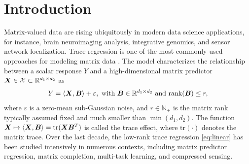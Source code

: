 \documentclass[aos]{imsart}
\theoremstyle{definition}
\begin{document}

\section{Introduction}
\label{sec:intro}

Matrix-valued data are rising ubiquitously in modern data science applications, for instance, brain neuroimaging analysis, integrative genomics, and sensor network localization. Trace regression is one of the most commonly used approaches for modeling matrix data \cite{fan2019generalized,hamidi2019low}. The model characterizes the relationship between a scalar response $Y$ and a high-dimensional matrix predictor $\bm X \in \mathcal{X} \subset \mathbb{R}^{d_1\times d_2}$ as 
\begin{equation}\label{eq:linear}
Y=\langle \mX, \mB \rangle+ \varepsilon,\ \text{with } \mB \in \mathbb{R}^{d_1\times d_2} \text{ and rank}(\mB)\leq r,
\end{equation}
where $\varepsilon$ is a zero-mean sub-Gaussian noise, and $r\in\mathbb{N}_{+}$ is the matrix rank typically assumed fixed and much smaller than $\min(d_1,d_2)$. The function $\bm X\mapsto \langle \bm X,\bm B\rangle=\text{tr}(\bm X\bm B^T)$ is called the trace effect, where $\text{tr}(\cdot)$ denotes the matrix trace. Over the last decade, the low-rank trace regression \eqref{eq:linear} has been studied intensively in numerous contexts, including matrix predictor regression, matrix completion, multi-task learning, and compressed sensing.
\end{document}
